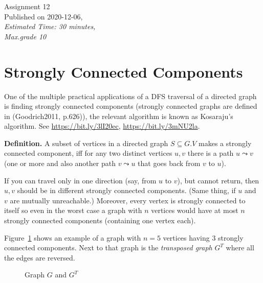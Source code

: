 \documentclass[a4paper,12pt]{article}
\begin{document}
\twocolumn

\thispagestyle{empty}

\begin{center}
{\Large Assignment 12}\\
{\Large Published on 2020-12-06,}\\
{\em Estimated Time: 30 minutes,}\\
{\em Max.grade 10\textperthousand} 
\end{center}


\section{Strongly Connected Components}

One of the multiple practical applications of a DFS traversal of a directed graph
is finding strongly connected components (strongly connected graphs are defined 
in (Goodrich2011, p.626)), the relevant algorithm is 
known as Kosaraju's algorithm. 
See \url{https://bit.ly/3lI20ec}, \url{https://bit.ly/3mNU2la}. 

{\bf Definition.} A subset of vertices in a directed graph $S \subseteq G.V$ makes a strongly 
connected component, iff for any two distinct vertices $u,v$ there is 
a path $u \leadsto v$ (one or more  and also another path $v \leadsto u$ that goes 
back from $v$ to $u$).

If you can travel only in one direction (say, from $u$ to $v$), but cannot return, 
then $u,v$ should be in different strongly connected components.
(Same thing, if $u$ and $v$ are mutually unreachable.) Moreover, every 
vertex is strongly connected to itself \textendash{} so even in the worst case
a graph with $n$ vertices would have at most $n$ strongly connected components 
(containing one vertex each). 

Figure~\ref{fig:strongly-connected-transposed} shows an example of a graph with $n=5$ vertices
having $3$ strongly connected components. Next to that graph is the {\em transposed graph} $G^T$
where all the edges are reversed.

\begin{figure}[!htb]
\caption{\label{fig:strongly-connected-transposed} Graph $G$ and $G^T$}
\end{figure}
\end{document}
